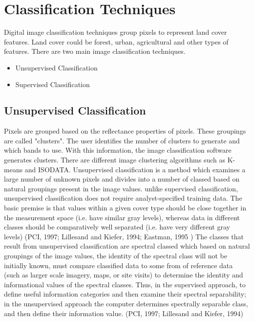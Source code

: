\documentclass[document.tex]{subfiles}
\begin{document}
\section{Classification Techniques}
\noindent Digital image classification techniques group pixels to represent land cover features. Land cover could be forest, urban, agricultural and other types of features. There are two main image classification techniques.
\begin{itemize}
	\item Unsupervised Classification
	\item Supervised Classification
\end{itemize}
\subsection{Unsupervised Classification}
\noindent Pixels are grouped based on the reflectance properties of pixels. These groupings are
called "clusters". The user identifies the number of clusters to generate and which bands
to use. With this information, the image classification software generates clusters. There
are different image clustering algorithms such as K-means and ISODATA.
Unsupervised classification is a method which examines a large number of unknown pixels and divides into a number of classed based on natural groupings present in the image values. unlike supervised classification, unsupervised classification does not require
analyst-specified training data. The basic premise is that values within a given cover
type should be close together in the measurement space (i.e. have similar gray levels),
whereas data in different classes should be comparatively well separated (i.e. have very
different gray levels) (PCI, 1997; Lillesand and Kiefer, 1994; Eastman, 1995 )
The classes that result from unsupervised classification are spectral classed which based on natural groupings of the image values, the identity of the spectral class will not be initially known, must compare classified data to some from of reference data (such as larger
scale imagery, maps, or site visits) to determine the identity and informational values
of the spectral classes. Thus, in the supervised approach, to define useful information
categories and then examine their spectral separability; in the unsupervised approach the
computer determines spectrally separable class, and then define their information value.
(PCI, 1997; Lillesand and Kiefer, 1994)
\end{document}
